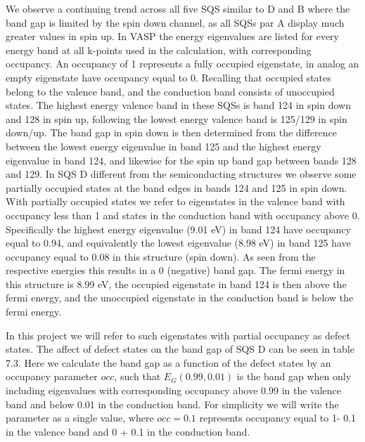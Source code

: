 We observe a continuing trend across all five SQS similar to D and B where the band gap is limited by the spin down channel, as all SQSs par A display much greater values in spin up. In VASP the energy eigenvalues are listed for every energy band at all k-points used in the calculation, with corresponding occupancy. An occupancy of 1 represents a fully occupied eigenstate, in analog an empty eigenstate have occupancy equal to 0. Recalling that occupied states belong to the valence band, and the conduction band consists of unoccupied states. The highest energy valence band in these SQSs is band 124 in spin down and 128 in spin up, following the lowest energy valence band is 125/129 in spin down/up. The band gap in spin down is then determined from the difference between the lowest energy eigenvalue in band 125 and the highest energy eigenvalue in band 124, and likewise for the spin up band gap between bands 128 and 129. In SQS D different from the semiconducting structures we observe some partially occupied states at the band edges in bands 124 and 125 in spin down. With partially occupied states we refer to eigenstates in the valence band with occupancy less than 1 and states in the conduction band with occupancy above 0. Specifically the highest energy eigenvalue (9.01 eV) in band 124 have occupancy equal to 0.94, and equivalently the lowest eigenvalue (8.98 eV) in band 125 have occupancy equal to 0.08 in this structure (spin down). As seen from the respective energies this results in a 0 (negative) band gap. The fermi energy in this structure is 8.99 eV, the occupied eigenstate in band 124 is then above the fermi energy, and the unoccupied eigenstate in the conduction band is below the fermi energy.  

In this project we will refer to such eigenstates with partial occupancy as defect states. The affect of defect states on the band gap of SQS D can be seen in table 7.3. Here we calculate the band gap as a function of the defect states by an occupancy parameter $occ$, such that $E_G (0.99, 0.01)$ is the band gap when only including eigenvalues with corresponding occupancy above 0.99 in the valence band and below 0.01 in the conduction band. For simplicity we will write the parameter as a single value, where $occ = 0.1$ represents occupancy equal to 1- 0.1 in the valence band and 0 + 0.1 in the conduction band.

